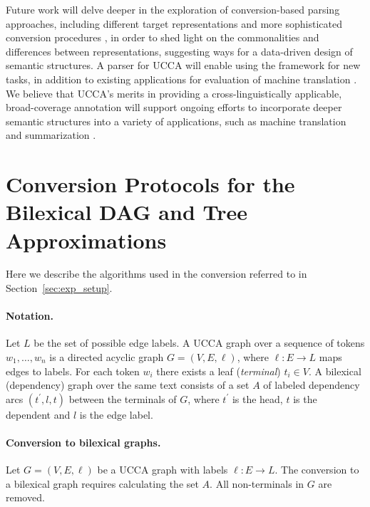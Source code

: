 \documentclass[11pt,a4paper]{article}
\newcommand{\secref}[1]{Section~\ref{#1}}
\begin{document}
Future work will delve deeper in the exploration of
conversion-based parsing approaches, including different target
representations and more sophisticated conversion procedures \cite{kong-15},
in order to shed light on the commonalities and differences between
representations, suggesting ways for a data-driven design of semantic structures.
A parser for UCCA will enable using the framework for new tasks,
in addition to existing applications for evaluation of
machine translation \cite{birch2016hume}.
We believe that UCCA's merits in providing a cross-linguistically applicable,
broad-coverage annotation will support ongoing efforts to incorporate deeper
semantic structures into a variety of applications,
such as machine translation \cite{jones2012semantics}
and summarization \cite{liu2015toward}.










\appendix
\section{Conversion Protocols for the Bilexical DAG and Tree Approximations}
\label{appendix:conversion}

Here we describe the algorithms used in the conversion referred to in \secref{sec:exp_setup}.

\paragraph{Notation.}
Let $L$ be the set of possible edge labels.
A UCCA graph over a sequence of tokens $w_1, \ldots, w_n$ is a directed acyclic graph
$G=(V,E, \ell)$, where $\ell:E\to L$ maps edges to labels.
For each token $w_i$ there exists a leaf (\emph{terminal}) $t_i \in V$.
A bilexical (dependency) graph over the same text consists of a set $A$ of
labeled dependency arcs $(t^\prime,l,t)$
between the terminals of $G$, where $t^\prime$ is the head, $t$ is the dependent and $l$ is
the edge label.

\paragraph{Conversion to bilexical graphs.}
Let $G=(V,E,\ell)$ be a UCCA graph with labels $\ell:E\rightarrow L$.
The conversion to a bilexical graph requires calculating the set $A$.
All non-terminals in $G$ are removed.
\end{document}
